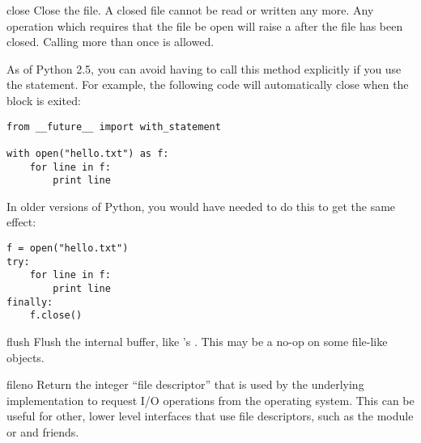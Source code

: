 \begin{methoddesc}[file]{close}{}
  Close the file.  A closed file cannot be read or written any more.
  Any operation which requires that the file be open will raise a
   after the file has been closed.  Calling
   more than once is allowed.

  As of Python 2.5, you can avoid having to call this method explicitly
  if you use the  statement.  For example, the following
  code will automatically close  when the  block
  is exited:

\begin{verbatim}
from __future__ import with_statement

with open("hello.txt") as f:
    for line in f:
        print line
\end{verbatim}

  In older versions of Python, you would have needed to do this to get
  the same effect:

\begin{verbatim}
f = open("hello.txt")
try:
    for line in f:
        print line
finally:
    f.close()
\end{verbatim}

  
\end{methoddesc}

\begin{methoddesc}[file]{flush}{}
  Flush the internal buffer, like 's
  .  This may be a no-op on some file-like
  objects.
\end{methoddesc}

\begin{methoddesc}[file]{fileno}{}
  Return the integer ``file descriptor'' that is used by the
  underlying implementation to request I/O operations from the
  operating system.  This can be useful for other, lower level
  interfaces that use file descriptors, such as the
   module or
   and friends.  
\end{methoddesc}

